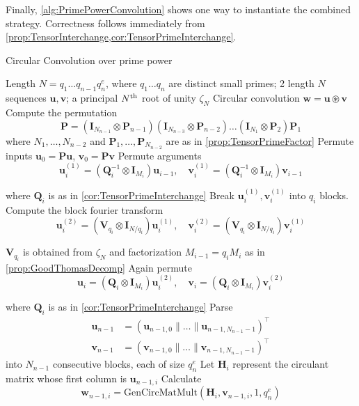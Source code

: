 Finally, \cref{alg:PrimePowerConvolution} shows one way to instantiate the combined strategy. Correctness follows immediately from \cref{prop:TensorInterchange,cor:TensorPrimeInterchange}.
\begin{algorithm}[h]
    \caption{Circular Convolution over prime power} \label{alg:PrimePowerConvolution}
    \begin{algorithmic}[1]
        \Require Length \(N = q_1 \ldots q_{n-1} q_n^e\), where \(q_1\ldots q_n\) are distinct small primes; 2 length \(N\) sequences \(\bm{u}, \bm{v}\); a principal \(N\textsuperscript{th}\) root of unity \(\zeta_N\)
        \Ensure Circular convolution \(\bm{w} = \bm{u} \circledast \bm{v}\)
        \State Compute the permutation
        \[\bm{P} = \left(\bm{I}_{N_{n-1}} \otimes \bm{P}_{n-1}\right) \left(\bm{I}_{N_{n-3}} \otimes \bm{P}_{n-2}\right) \ldots \left(\bm{I}_{N_1} \otimes \bm{P}_2\right) \bm{P}_1\]
        where \(N_1, \ldots , N_{n-2}\) and \(\bm{P}_1, \ldots , \bm{P}_{N_{n-2}}\) are as in \cref{prop:TensorPrimeFactor}
        \State Permute inputs \(\bm{u}_0 = \bm{P} \bm{u}\), \(\bm{v}_0 = \bm{P} \bm{v}\)
            \State Permute arguments 
            \[\bm{u}_i^{(1)} = \left(\bm{Q}_i^{-1} \otimes \bm{I}_{M_i}\right) \bm{u}_{i-1}, \quad \bm{v}_i^{(1)} = \left(\bm{Q}_i^{-1} \otimes \bm{I}_{M_i}\right) \bm{v}_{i-1}\]

            where \(\bm{Q}_i\) is as in \cref{cor:TensorPrimeInterchange}
            \State Break \(\bm{u}_i^{(1)}, \bm{v}_i^{(1)}\) into \(q_i\) blocks. Compute the block fourier transform
            \[\bm{u}_i^{(2)} = \left(\bm{V}_{q_i} \otimes \bm{I}_{N / q_i}\right) \bm{u}_i^{(1)}, \quad \bm{v}_i^{(2)} = \left(\bm{V}_{q_i} \otimes \bm{I}_{N / q_i}\right) \bm{v}_i^{(1)}\]

            \(\bm{V}_{q_i}\) is obtained from \(\zeta_N\) and factorization \(M_{i-1} = q_i M_i\) as in \cref{prop:GoodThomasDecomp}
            \State Again permute
            \[\bm{u}_i = \left(\bm{Q}_i \otimes \bm{I}_{M_i}\right) \bm{u}_i^{(2)}, \quad \bm{v}_i = \left(\bm{Q}_i \otimes \bm{I}_{M_i}\right) \bm{v}_i^{(2)}\]

            where \(\bm{Q}_i\) is as in \cref{cor:TensorPrimeInterchange}
        \EndFor
        \State Parse
        \begin{align*}
            \bm{u}_{n-1} &= (\bm{u}_{n-1, 0} \parallel \ldots \parallel \bm{u}_{n-1, N_{n-1}-1})^{\top} \\
            \bm{v}_{n-1} &= (\bm{v}_{n-1, 0} \parallel \ldots \parallel \bm{v}_{n-1, N_{n-1}-1})^{\top}
        \end{align*}
        into \(N_{n-1}\) consecutive blocks, each of size \(q_n^e\)
            \State Let \(\bm{H}_i\) represent the circulant matrix whose first column is \(\bm{u}_{n-1, i}\)
            \State Calculate
            \[\bm{w}_{n-1, i} = \text{GenCircMatMult}(\bm{H}_i, \bm{v}_{n-1, i}, 1, q_n^e)\]


\end{algorithmic}
\end{algorithm}
